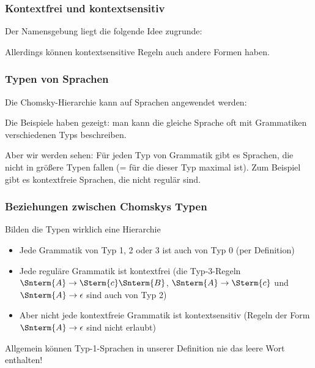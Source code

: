 \documentclass[aspectratio=1610,onlymath]{beamer}
\begin{document}
\begin{frame}\frametitle{Kontextfrei und kontextsensitiv}

Der Namensgebung liegt die folgende Idee zugrunde:\medskip

\medskip

\medskip

Allerdings können kontextsensitive Regeln auch andere Formen haben.

\end{frame}

\begin{frame}\frametitle{Typen von Sprachen}

Die Chomsky-Hierarchie kann auf Sprachen angewendet werden:\medskip

\medskip

Die Beispiele haben gezeigt: man kann die gleiche Sprache oft mit Grammatiken verschiedenen Typs beschreiben.
\medskip

Aber wir werden sehen: Für jeden Typ von Grammatik gibt es Sprachen, die nicht in größere Typen fallen (= für die dieser Typ maximal ist). Zum Beispiel gibt es kontextfreie Sprachen, die nicht regulär sind.

\end{frame}


\begin{frame}\frametitle{Beziehungen zwischen Chomskys Typen}

Bilden die Typen wirklich eine Hierarchie\\[1ex]

\begin{itemize}
\item Jede Grammatik von Typ 1, 2 oder 3 ist auch von Typ 0 (per Definition)
\item Jede reguläre Grammatik ist kontextfrei
(die Typ-3-Regeln
$\Snterm{A}\to \Sterm{c}\Snterm{B}$, $\Snterm{A}\to \Sterm{c}$ und $\Snterm{A}\to \epsilon$ sind auch von Typ 2)
\item Aber nicht jede kontextfreie Grammatik ist kontextsensitiv
(Regeln der Form $\Snterm{A}\to \epsilon$ sind nicht erlaubt)
\end{itemize}

Allgemein können Typ-1-Sprachen in unserer Definition nie das leere Wort enthalten!

\end{frame}
\end{document}
